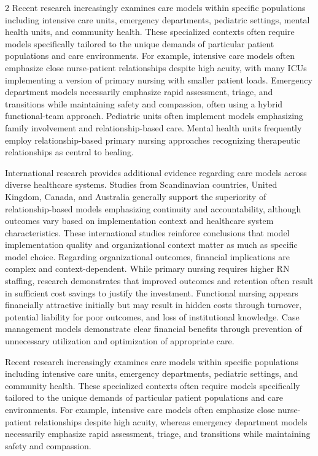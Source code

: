 \documentclass[12pt]{article}
\begin{document}
\begin{multicols}{2}
Recent research increasingly examines care models within specific populations including intensive care units, emergency departments, pediatric settings, mental health units, and community health. These specialized contexts often require models specifically tailored to the unique demands of particular patient populations and care environments. For example, intensive care models often emphasize close nurse-patient relationships despite high acuity, with many ICUs implementing a version of primary nursing with smaller patient loads. Emergency department models necessarily emphasize rapid assessment, triage, and transitions while maintaining safety and compassion, often using a hybrid functional-team approach. Pediatric units often implement models emphasizing family involvement and relationship-based care. Mental health units frequently employ relationship-based primary nursing approaches recognizing therapeutic relationships as central to healing.

International research provides additional evidence regarding care models across diverse healthcare systems. Studies from Scandinavian countries, United Kingdom, Canada, and Australia generally support the superiority of relationship-based models emphasizing continuity and accountability, although outcomes vary based on implementation context and healthcare system characteristics. These international studies reinforce conclusions that model implementation quality and organizational context matter as much as specific model choice.
Regarding organizational outcomes, financial implications are complex and context-dependent. While primary nursing requires higher RN staffing, research demonstrates that improved outcomes and retention often result in sufficient cost savings to justify the investment. Functional nursing appears financially attractive initially but may result in hidden costs through turnover, potential liability for poor outcomes, and loss of institutional knowledge. Case management models demonstrate clear financial benefits through prevention of unnecessary utilization and optimization of appropriate care.

Recent research increasingly examines care models within specific populations including intensive care units, emergency departments, pediatric settings, and community health. These specialized contexts often require models specifically tailored to the unique demands of particular patient populations and care environments. For example, intensive care models often emphasize close nurse-patient relationships despite high acuity, whereas emergency department models necessarily emphasize rapid assessment, triage, and transitions while maintaining safety and compassion.


\end{multicols}
\end{document}
